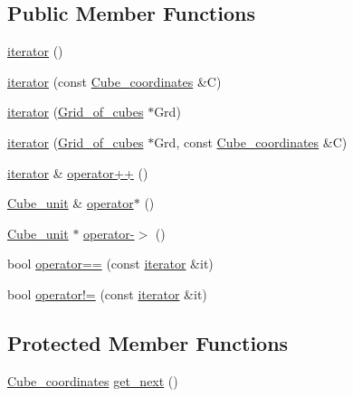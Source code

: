 \subsection*{Public Member Functions}
\begin{DoxyCompactItemize}
\item 
\hyperlink{classESBTL_1_1Grid__of__cubes_1_1iterator_a5001cc15c0fa9403d6918232e4b1615e}{iterator} ()
\item 
\hyperlink{classESBTL_1_1Grid__of__cubes_1_1iterator_aed5f716a67875af48b15bad0d34b7b8d}{iterator} (const \hyperlink{structESBTL_1_1Grid__of__cubes_ad55c84346bab961e08d95e494551d07d}{Cube\+\_\+coordinates} \&C)
\item 
\hyperlink{classESBTL_1_1Grid__of__cubes_1_1iterator_abb5f0f7eb3481c3e8b6bb6d4c9ea685d}{iterator} (\hyperlink{structESBTL_1_1Grid__of__cubes}{Grid\+\_\+of\+\_\+cubes} $\ast$Grd)
\item 
\hyperlink{classESBTL_1_1Grid__of__cubes_1_1iterator_a03419d0f3256eecdd89560a8e0bbea8c}{iterator} (\hyperlink{structESBTL_1_1Grid__of__cubes}{Grid\+\_\+of\+\_\+cubes} $\ast$Grd, const \hyperlink{structESBTL_1_1Grid__of__cubes_ad55c84346bab961e08d95e494551d07d}{Cube\+\_\+coordinates} \&C)
\item 
\hyperlink{classESBTL_1_1Grid__of__cubes_1_1iterator}{iterator} \& \hyperlink{classESBTL_1_1Grid__of__cubes_1_1iterator_a276b1498dca08866f128292f6505609c}{operator++} ()
\item 
\hyperlink{structESBTL_1_1Grid__of__cubes_1_1Cube__unit}{Cube\+\_\+unit} \& \hyperlink{classESBTL_1_1Grid__of__cubes_1_1iterator_aa3017ff39fe5fbc9658bd998297da766}{operator$\ast$} ()
\item 
\hyperlink{structESBTL_1_1Grid__of__cubes_1_1Cube__unit}{Cube\+\_\+unit} $\ast$ \hyperlink{classESBTL_1_1Grid__of__cubes_1_1iterator_a6244a3042ab6bc853b3cf9b5d1b55969}{operator-\/$>$} ()
\item 
bool \hyperlink{classESBTL_1_1Grid__of__cubes_1_1iterator_a94ea652fb193dcb86f982a42ebf6d0cb}{operator==} (const \hyperlink{classESBTL_1_1Grid__of__cubes_1_1iterator}{iterator} \&it)
\item 
bool \hyperlink{classESBTL_1_1Grid__of__cubes_1_1iterator_a4253cb445b2ab323b8db82336b6c554f}{operator!=} (const \hyperlink{classESBTL_1_1Grid__of__cubes_1_1iterator}{iterator} \&it)
\end{DoxyCompactItemize}
\subsection*{Protected Member Functions}
\begin{DoxyCompactItemize}
\item 
\hyperlink{structESBTL_1_1Grid__of__cubes_ad55c84346bab961e08d95e494551d07d}{Cube\+\_\+coordinates} \hyperlink{classESBTL_1_1Grid__of__cubes_1_1iterator_a8d881de503568216ba8f4ebef6b144f2}{get\+\_\+next} ()
\end{DoxyCompactItemize}
